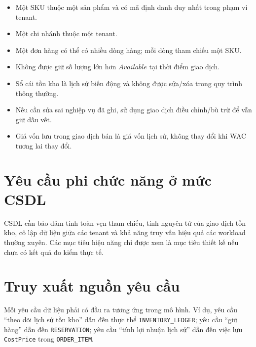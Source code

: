 \begin{itemize}
    \item Một SKU thuộc một sản phẩm và có mã định danh duy nhất trong phạm vi tenant.
    \item Một chi nhánh thuộc một tenant.
    \item Một đơn hàng có thể có nhiều dòng hàng; mỗi dòng tham chiếu một SKU.
    \item Không được giữ số lượng lớn hơn $Available$ tại thời điểm giao dịch.
    \item Sổ cái tồn kho là lịch sử biến động và không được sửa/xóa trong quy trình thông thường.
    \item Nếu cần sửa sai nghiệp vụ đã ghi, sử dụng giao dịch điều chỉnh/bù trừ để vẫn giữ dấu vết.
    \item Giá vốn lưu trong giao dịch bán là giá vốn lịch sử, không thay đổi khi WAC tương lai thay đổi.
\end{itemize}

\section{Yêu cầu phi chức năng ở mức CSDL}

CSDL cần bảo đảm tính toàn vẹn tham chiếu, tính nguyên tử của giao dịch tồn kho, cô lập dữ liệu giữa các tenant và khả năng truy vấn hiệu quả các workload thường xuyên. Các mục tiêu hiệu năng chỉ được xem là mục tiêu thiết kế nếu chưa có kết quả đo kiểm thực tế.

\section{Truy xuất nguồn yêu cầu}

Mỗi yêu cầu dữ liệu phải có đầu ra tương ứng trong mô hình. Ví dụ, yêu cầu ``theo dõi lịch sử tồn kho'' dẫn đến thực thể \texttt{INVENTORY\_LEDGER}; yêu cầu ``giữ hàng'' dẫn đến \texttt{RESERVATION}; yêu cầu ``tính lợi nhuận lịch sử'' dẫn đến việc lưu \texttt{CostPrice} trong \texttt{ORDER\_ITEM}.
